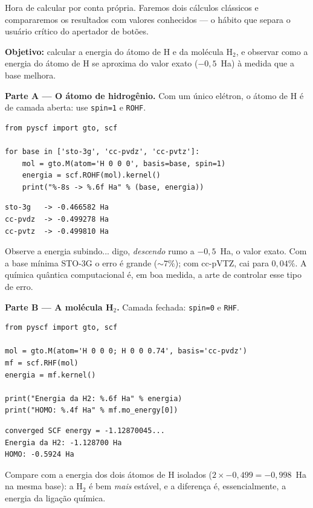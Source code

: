 \documentclass[11pt,a4paper,openany]{book}
\newcommand{\code}[1]{\texttt{#1}}
\begin{document}
Hora de calcular por conta própria. Faremos dois cálculos clássicos e
compararemos os resultados com valores conhecidos --- o hábito que separa o
usuário crítico do apertador de botões.

\begin{caixamaos}
\textbf{Objetivo:} calcular a energia do átomo de H e da molécula H$_2$, e
observar como a energia do átomo de H se aproxima do valor exato ($-0{,}5$~Ha)
à medida que a base melhora.

\vspace{0.4cm}
\textbf{Parte A --- O átomo de hidrogênio.} Com um único elétron, o átomo de H é
de camada aberta: use \code{spin=1} e \code{ROHF}.

\begin{lstlisting}[style=python]
from pyscf import gto, scf

for base in ['sto-3g', 'cc-pvdz', 'cc-pvtz']:
    mol = gto.M(atom='H 0 0 0', basis=base, spin=1)
    energia = scf.ROHF(mol).kernel()
    print("%-8s -> %.6f Ha" % (base, energia))
\end{lstlisting}

\begin{lstlisting}[style=console]
sto-3g   -> -0.466582 Ha
cc-pvdz  -> -0.499278 Ha
cc-pvtz  -> -0.499810 Ha
\end{lstlisting}

Observe a energia subindo... digo, \emph{descendo} rumo a $-0{,}5$~Ha, o valor
exato. Com a base mínima STO-3G o erro é grande ($\sim 7\%$); com cc-pVTZ, cai
para $0{,}04\%$. A química quântica computacional é, em boa medida, a arte de
controlar esse tipo de erro.

\vspace{0.4cm}
\textbf{Parte B --- A molécula H$_2$.} Camada fechada: \code{spin=0} e \code{RHF}.

\begin{lstlisting}[style=python]
from pyscf import gto, scf

mol = gto.M(atom='H 0 0 0; H 0 0 0.74', basis='cc-pvdz')
mf = scf.RHF(mol)
energia = mf.kernel()

print("Energia da H2: %.6f Ha" % energia)
print("HOMO: %.4f Ha" % mf.mo_energy[0])
\end{lstlisting}

\begin{lstlisting}[style=console]
converged SCF energy = -1.12870045...
Energia da H2: -1.128700 Ha
HOMO: -0.5924 Ha
\end{lstlisting}

Compare com a energia dos dois átomos de H isolados ($2 \times -0{,}499 =
-0{,}998$~Ha na mesma base): a H$_2$ é bem \emph{mais} estável, e a diferença é,
essencialmente, a energia da ligação química.
\end{caixamaos}
\end{document}
